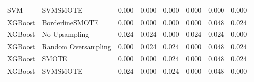 \begin{tabular}{llllllll}
                            SVM &                      SVMSMOTE & 0.000 &                     0.000 &                 0.000 &                  0.000 &                                   0.000 &     0.000 \\
                        XGBoost &               BorderlineSMOTE & 0.000 &                     0.000 &                 0.000 &                  0.000 &                                   0.048 &     0.024 \\
                        XGBoost &                 No Upsampling & 0.024 &                     0.024 &                 0.000 &                  0.024 &                                   0.024 &     0.000 \\
                        XGBoost &           Random Oversampling & 0.000 &                     0.024 &                 0.024 &                  0.000 &                                   0.048 &     0.024 \\
                        XGBoost &                         SMOTE & 0.000 &                     0.000 &                 0.024 &                  0.000 &                                   0.048 &     0.024 \\
                        XGBoost &                      SVMSMOTE & 0.024 &                     0.000 &                 0.024 &                  0.000 &                                   0.048 &     0.000 \\
\bottomrule
\end{tabular}
